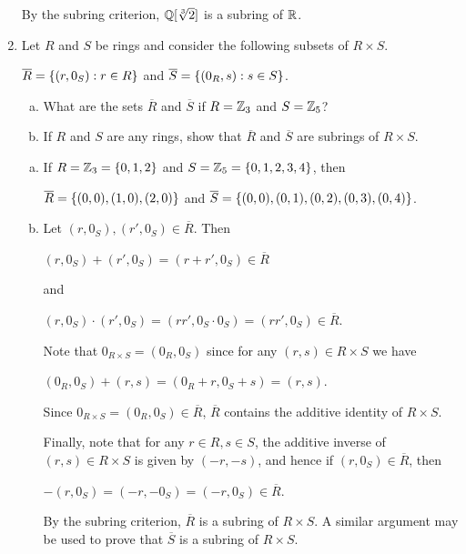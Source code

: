 \documentclass[11pt,fleqn,dvipsnames,usenames]{article}
\begin{document}
\begin{enumerate}[1.]
By the subring criterion, $\mathbb{Q}[\sqrt[3]{2}]$ is a subring of $\mathbb{R}$.

\item Let $R$ and $S$ be rings and consider the following subsets of $R\times S$.
\begin{center}
$\overline{R} = \left\{(r,0_{S}):r\in R\right\}$ and $\overline{S} = \left\{(0_{R}, s):s\in S\right\}$.
\end{center}
\begin{enumerate}[(a)]
\item What are the sets $\overline{R}$ and $\overline{S}$ if $R = \mathbb{Z}_{3}$ and $S = \mathbb{Z}_{5}$?
\item If $R$ and $S$ are any rings, show that $\overline{R}$ and $\overline{S}$ are subrings of $R\times S$.
\end{enumerate}
\vsmsp

\solution 
\begin{enumerate}[(a)]
\item If $R = \mathbb{Z}_{3} = \left\{0,1,2\right\}$ and $S = \mathbb{Z}_{5} = \left\{0,1,2,3,4\right\}$, then
\begin{center}
$\overline{R} = \left\{(0,0), (1,0), (2,0)\right\}$ and $\overline{S} = \left\{(0,0), (0,1), (0,2), (0,3), (0,4)\right\}$.
\end{center}
\item Let $(r,0_{S}), (r',0_{S})\in \overline{R}$.  Then
\begin{center}
$(r,0_{S}) + (r',0_{S}) = (r + r',0_{S})\in \overline{R}$
\end{center}
and 
\begin{center}
$(r,0_{S})\cdot (r',0_{S}) = (rr', 0_{S}\cdot 0_{S}) = (rr', 0_{S})\in\overline{R}$.
\end{center}
Note that $0_{R\times S} = (0_{R},0_{S})$ since for any $(r,s)\in R\times S$ we have
\begin{center}
$(0_{R},0_{S}) + (r,s) = (0_{R} + r, 0_{S} + s) = (r,s)$.
\end{center}
Since $0_{R\times S} = (0_{R},0_{S})\in \overline{R}$, $\overline{R}$ contains the additive identity of $R\times S$.
\vsp

Finally, note that for any $r\in R,s\in S$, the additive inverse of $(r,s)\in R\times S$ is given by $(-r,-s)$, and hence if $(r,0_{S})\in \overline{R}$, then
\begin{center}
$-(r,0_{S}) = (-r, -0_{S}) = (-r, 0_{S})\in \overline{R}$.
\end{center}

By the subring criterion, $\overline{R}$ is a subring of $R\times S$.  A similar argument may be used to prove that $\overline{S}$ is a subring of $R\times S$.
\end{enumerate}



\end{enumerate}
\end{document}
